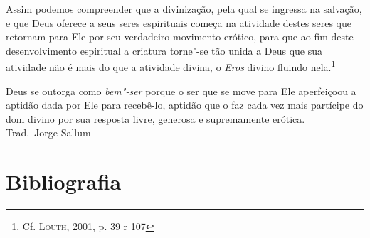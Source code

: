 Assim podemos compreender que a divinização, pela qual se ingressa na salvação,
e que Deus oferece a seus seres espirituais começa na atividade destes seres
que retornam para Ele por seu verdadeiro movimento erótico, para que ao fim
deste desenvolvimento espiritual a criatura torne"-se tão unida a Deus que sua
atividade não é mais do que a atividade divina, o \textit{Eros} divino fluindo
nela.\footnote{
  Cf. \textsc{Louth}, 2001, p. 39 r 107} 

Deus se outorga como \textit{bem"-ser} porque o ser que se move para Ele
aperfeiçoou a aptidão dada por Ele para recebê-lo, aptidão que o faz cada vez
mais partícipe do dom divino por sua resposta livre, generosa e supremamente
erótica.\\ 
\bigskip
\hfill Trad.~Jorge Sallum

\section{Bibliografia}

